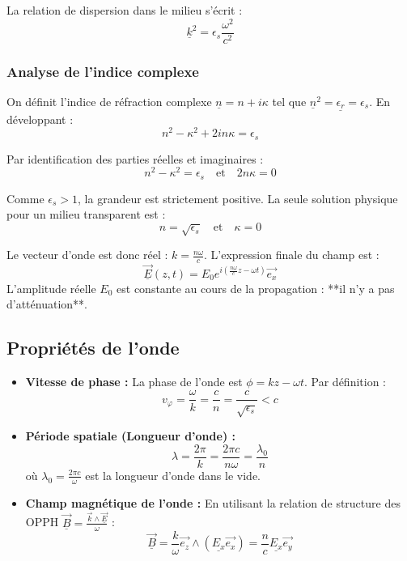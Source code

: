 \documentclass[french]{yLectureNote}
\renewcommand{\vec}{\overrightarrow}
\begin{document}
\begin{theorem}
La relation de dispersion dans le milieu s'écrit :
$$\underline{k}^2 = \epsilon_s \frac{\omega^2}{c^2}$$
\end{theorem}

\subsubsection{Analyse de l'indice complexe}

On définit l'indice de réfraction complexe $\underline{n} = n + i\kappa$ tel que $\underline{n}^2 = \underline{\epsilon_r} = \epsilon_s$. En développant :
$$n^2 - \kappa^2 + 2in\kappa = \epsilon_s$$

Par identification des parties réelles et imaginaires :
$$n^2 - \kappa^2 = \epsilon_s \quad \text{et} \quad 2n\kappa = 0$$

Comme $\epsilon_s > 1$, la grandeur est strictement positive. La seule solution physique pour un milieu transparent est :
$$n = \sqrt{\epsilon_s} \quad \text{et} \quad \kappa = 0$$

Le vecteur d'onde est donc réel : $k = \frac{n\omega}{c}$. L'expression finale du champ est :
$$\underline{\vec{E}}(z,t) = E_0 e^{i\left(\frac{n\omega}{c}z - \omega t\right)}\vec{e_x}$$
L'amplitude réelle $E_0$ est constante au cours de la propagation : **il n'y a pas d'atténuation**.

\subsection{Propriétés de l'onde}

\begin{itemize}
    \item \textbf{Vitesse de phase :} La phase de l'onde est $\phi = kz - \omega t$. Par définition :
    $$v_{\varphi} = \frac{\omega}{k} = \frac{c}{n} = \frac{c}{\sqrt{\epsilon_s}} < c$$
    
    \item \textbf{Période spatiale (Longueur d'onde) :} 
    $$\lambda = \frac{2\pi}{k} = \frac{2\pi c}{n\omega} = \frac{\lambda_0}{n}$$
    où $\lambda_0 = \frac{2\pi c}{\omega}$ est la longueur d'onde dans le vide.
    
    \item \textbf{Champ magnétique de l'onde : } En utilisant la relation de structure des OPPH $\underline{\vec{B}} = \frac{\vec{k} \wedge \underline{\vec{E}}}{\omega}$ :
    $$\underline{\vec{B}} = \frac{k}{\omega}\vec{e_z} \wedge \left(\underline{E_x}\vec{e_x}\right) = \frac{n}{c}\underline{E_x}\vec{e_y}$$
\end{itemize}
\end{document}

